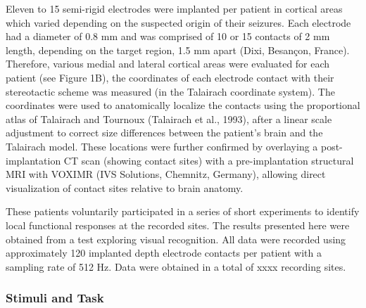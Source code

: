 \documentclass[final]{jneurosci}
\begin{document}
Eleven to 15 semi-rigid electrodes were implanted per patient in cortical areas which varied depending on the suspected origin of their seizures. Each electrode had a diameter of 0.8 mm and was comprised of 10 or 15 contacts of 2 mm length, depending on the target region, 1.5 mm apart (Dixi, Besançon, France). Therefore, various medial and lateral cortical areas were evaluated for each patient (see Figure 1B), the coordinates of each electrode contact with their stereotactic scheme was measured (in the Talairach coordinate system). The coordinates were used to anatomically localize the contacts using the proportional atlas of Talairach and Tournoux (Talairach et al., 1993), after a linear scale adjustment to correct size differences between the patient’s brain and the Talairach model. These locations were further confirmed by overlaying a post-implantation CT scan (showing contact sites) with a pre-implantation structural MRI with VOXIMR (IVS Solutions, Chemnitz, Germany), allowing direct visualization of contact sites relative to brain anatomy.

These patients voluntarily participated in a series of short experiments to identify local functional responses at the recorded sites. The results presented here were obtained from a test exploring visual recognition. All data were recorded using approximately 120 implanted depth electrode contacts per patient with a sampling rate of 512 Hz. Data were obtained in a total of xxxx recording sites.

\subsubsection{Stimuli and Task}
\label{sec:stimuli-and-task}
\end{document}
